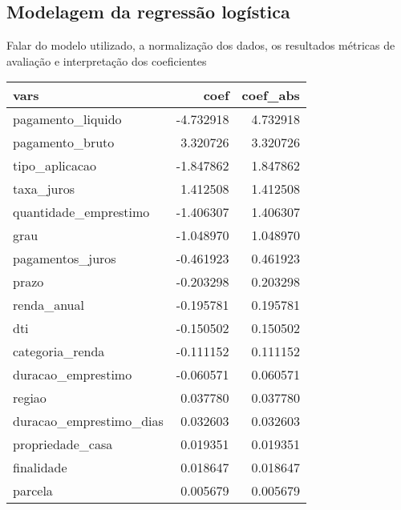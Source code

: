\subsection*{Modelagem da regressão logística}
Falar do modelo utilizado, a normalização dos dados, os resultados
métricas de avaliação e interpretação dos coeficientes

\centering
\begin{tabular}{lrr}
  \toprule
                     vars &      coef &  coef\_abs \\
  \midrule
        pagamento\_liquido & -4.732918 &  4.732918 \\
          pagamento\_bruto &  3.320726 &  3.320726 \\
           tipo\_aplicacao & -1.847862 &  1.847862 \\
               taxa\_juros &  1.412508 &  1.412508 \\
    quantidade\_emprestimo & -1.406307 &  1.406307 \\
                     grau & -1.048970 &  1.048970 \\
         pagamentos\_juros & -0.461923 &  0.461923 \\
                    prazo & -0.203298 &  0.203298 \\
              renda\_anual & -0.195781 &  0.195781 \\
                      dti & -0.150502 &  0.150502 \\
          categoria\_renda & -0.111152 &  0.111152 \\
       duracao\_emprestimo & -0.060571 &  0.060571 \\
                   regiao &  0.037780 &  0.037780 \\
  duracao\_emprestimo\_dias &  0.032603 &  0.032603 \\
         propriedade\_casa &  0.019351 &  0.019351 \\
               finalidade &  0.018647 &  0.018647 \\
                  parcela &  0.005679 &  0.005679 \\
  \bottomrule
\end{tabular}

